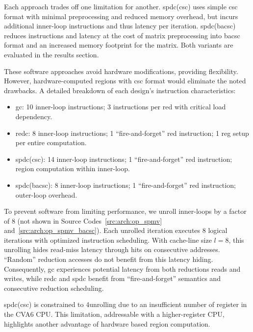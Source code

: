 
Each approach trades off one limitation for another.
\acrlong{spdc}(\acrshort{csc}) uses simple \acrshort{csc} format with minimal preprocessing and reduced memory overhead, but incurs additional inner-loop instructions and thus latency per iteration.
\acrlong{spdc}(\acrshort{bacsc}) reduces instructions and latency at the cost of matrix preprocessing into \acrshort{bacsc} format and an increased memory footprint for the matrix.
Both variants are evaluated in the results section.

These software approaches avoid hardware modifications, providing flexibility.
However, hardware-computed regions with \acrshort{csc} format would eliminate the noted drawbacks.
A detailed breakdown of each design's instruction characteristics:
\begin{itemize}
    \item \acrshort{gc}: 10 inner-loop instructions; 3 instructions per \acrshort{red} with critical load dependency.
    \item \acrshort{redc}: 8 inner-loop instructions; 1 ``fire-and-forget'' \acrshort{red} instruction; 1 \acrshort{reg} setup per entire computation.
    \item \acrlong{spdc}(\acrshort{csc}): 14 inner-loop instructions; 1 ``fire-and-forget'' \acrshort{red} instruction; region computation within inner-loop.
    \item \acrlong{spdc}(\acrshort{bacsc}): 8 inner-loop instructions; 1 ``fire-and-forget'' \acrshort{red} instruction; outer-loop overhead.
\end{itemize}

To prevent software from limiting performance, we unroll inner-loops by a factor of 8 (not shown in Source Codes~\ref{src:arch:op_spmv} and~\ref{src:arch:op_spmv_bacsc}).
Each unrolled iteration executes 8 logical iterations with optimized instruction scheduling.
With cache-line size $l = 8$, this unrolling hides read-\gls{miss} latency through \glspl{hit} on consecutive addresses.
``Random'' \gls{reduction} accesses do not benefit from this latency hiding.
Consequently, \acrshort{gc} experiences potential latency from both \glspl{reduction} reads and writes, while \acrshort{redc} and \acrlong{spdc} benefit from ``fire-and-forget'' semantics and consecutive \gls{reduction} scheduling.

\acrlong{spdc}(\acrshort{csc}) is constrained to 4\tms unrolling due to an insufficient number of register in the CVA6 CPU.
This limitation, addressable with a higher-register CPU, highlights another advantage of hardware based region computation.

